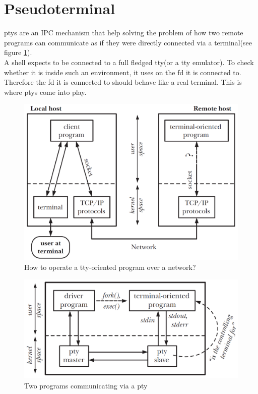 \documentclass[10pt,a4paper,titlepage,twoside,english,final]{zhawreprt}
\begin{document}
\section{Pseudoterminal}\label{sec:DesignPseudoterminal}
\glspl{pty} are an \gls{IPC} mechanism that help solving the problem of how two remote programs can communicate as if they were directly connected via a \gls{terminal}(see figure \ref{fig:HowToOperateTtyOrientedProgramOverNetwork}).\\
A \gls{shell} expects to be connected to a full fledged \gls{tty}(or a \gls{tty} emulator). To check whether it is inside such an environment, it uses \cite{isatty} on the \gls{fd} it is connected to. Therefore the \gls{fd} it is connected to should behave like a real \gls{terminal}. This is where \glspl{pty} come into play.
\begin{figure}[ht]
\includegraphics[width=\textwidth]{PseudoterminalProblem}
\caption{How to operate a \gls{tty}-oriented program over a network?\citep[p.1376]{KerriskTLPI}}
\label{fig:HowToOperateTtyOrientedProgramOverNetwork}
\end{figure}
\begin{figure}[ht]
\includegraphics[width=\textwidth]{Pseudoterminal}
\caption{Two programs communicating via a \gls{pty}\citep[p.1377]{KerriskTLPI}}
\label{fig:TwoProgramsCommunicatingViaAPty}
\end{figure}
\end{document}
